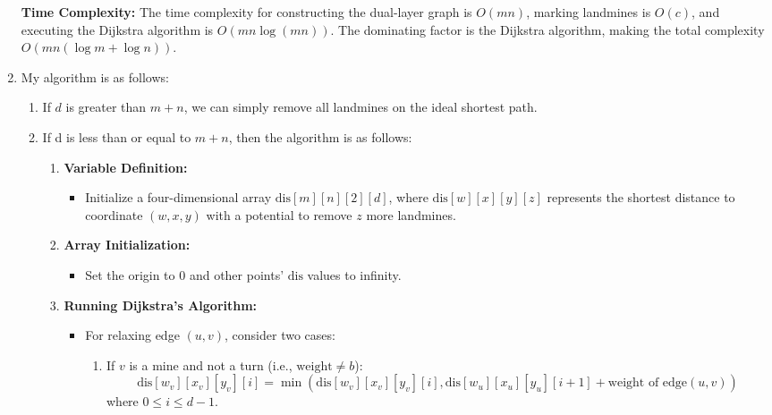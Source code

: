 \documentclass[letterpaper, 11pt]{article}
\newcommand{\1}{\mathds{1}}	%
\theoremstyle{definition}
\begin{document}
\begin{enumerate}[label=\arabic*., leftmargin=*, align=left, itemindent=0pt]
        \textbf{Time Complexity:} 
        The time complexity for constructing the dual-layer graph is \( O(mn) \), 
        marking landmines is \( O(c) \), 
        and executing the Dijkstra algorithm is \( O(mn \log(mn)) \). 
        The dominating factor is the Dijkstra algorithm, 
        making the total complexity \( O(mn(\log m + \log n)) \).
  \item My algorithm is as follows:
        \begin{enumerate}
          \item If $d$ is greater than  $m + n$, 
          we can simply remove all landmines on the ideal shortest path.
          \item If d is less than or equal to $m + n$, then the algorithm is as follows:
          
          \begin{enumerate}
            \item \textbf{Variable Definition:}
            \begin{itemize}
                \item Initialize a four-dimensional array \( \text{dis}[m][n][2][d] \), where \( \text{dis}[w][x][y][z] \) represents the shortest distance to coordinate \( (w, x, y) \) with a potential to remove \( z \) more landmines.
            \end{itemize}
        
            \item \textbf{Array Initialization:}
            \begin{itemize}
                \item Set the origin to \( 0 \) and other points' \( \text{dis} \) values to infinity.
            \end{itemize}
        
            \item \textbf{Running Dijkstra's Algorithm:}
            \begin{itemize}
                \item For relaxing edge \( (u, v) \), consider two cases:
                \begin{enumerate}
                    \item If \( v \) is a mine and not a turn (i.e., \( \text{weight} \neq b \)):
                    \[ \text{dis}[w_v][x_v][y_v][i] = \min(\text{dis}[w_v][x_v][y_v][i], \text{dis}[w_u][x_u][y_u][i + 1] + \text{weight of edge}(u, v)) \]
                    where \( 0 \leq i \leq d - 1 \).
                    

\end{enumerate}
\end{itemize}
\end{enumerate}
\end{enumerate}
\end{enumerate}
\end{document}
